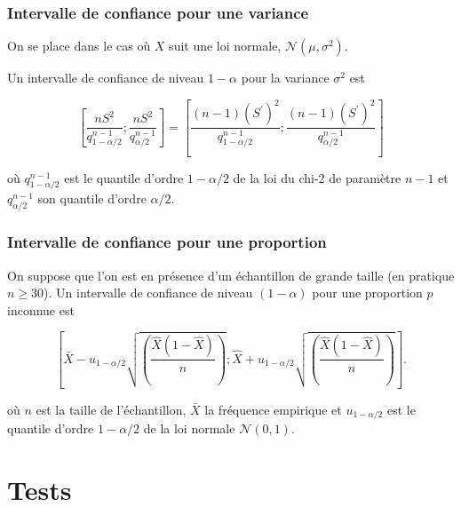\documentclass[]{book}
\theoremstyle{definition}
\theoremstyle{definition}
\theoremstyle{remark}
\begin{document}
\subsection{Intervalle de confiance pour une
variance}\label{intervalle-de-confiance-pour-une-variance}

On se place dans le cas où \(X\) suit une loi normale,
\(\mathcal N(\mu,\sigma^2)\).

Un intervalle de confiance de niveau \(1-\alpha\) pour la variance
\(\sigma^2\) est

\[
\left[ \frac{nS^2}{q^{n-1}_{1-\alpha/2}};\frac{nS^2}{q^{n-1}_{\alpha/2}}\right] = \left[ \frac{(n-1)(S^\prime)^2}{q^{n-1}_{1-\alpha/2}};\frac{(n-1)(S^\prime)^2}{q^{n-1}_{\alpha/2}}\right] 
\]

où \(q^{n-1}_{1-\alpha/2}\) est le quantile d'ordre \(1-\alpha/2\) de la
loi du chi-2 de paramètre \(n-1\) et \(q^{n-1}_{\alpha/2}\) son quantile
d'ordre \(\alpha/2\).

\subsection{Intervalle de confiance pour une
proportion}\label{intervalle-de-confiance-pour-une-proportion}

On suppose que l'on est en présence d'un échantillon de grande taille
(en pratique \(n\geq 30\)). Un intervalle de confiance de niveau
\((1-\alpha)\) pour une proportion \(p\) inconnue est

\[
\left[\bar X - u_{1-\alpha/2} \sqrt{(\frac{\hat X (1-\hat X)}{n})};\hat X + u_{1-\alpha/2} \sqrt{(\frac{\hat X (1-\hat X)}{n})} \right].
\]

où \(n\) est la taille de l'échantillon, \(\bar X\) la fréquence
empirique et \(u_{1-\alpha/2}\) est le quantile d'ordre \(1-\alpha/2\)
de la loi normale \(\mathcal N(0,1)\).

\chapter{Tests}\label{tests}


\end{document}
